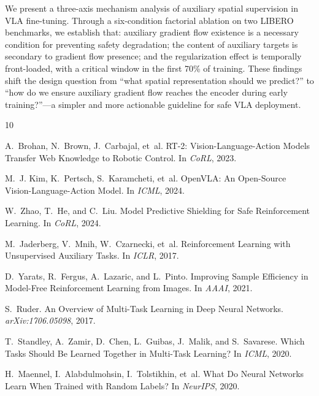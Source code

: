\documentclass[10pt,twocolumn]{article}
\begin{document}
We present a three-axis mechanism analysis of auxiliary spatial supervision in VLA fine-tuning.
Through a six-condition factorial ablation on two LIBERO benchmarks, we establish that:
auxiliary gradient flow existence is a necessary condition for preventing safety degradation;
the content of auxiliary targets is secondary to gradient flow presence;
and the regularization effect is temporally front-loaded, with a critical window in the first 70\% of training.
These findings shift the design question from ``what spatial representation should we predict?'' to ``how do we ensure auxiliary gradient flow reaches the encoder during early training?''---a simpler and more actionable guideline for safe VLA deployment.


\begin{thebibliography}{10}

A.~Brohan, N.~Brown, J.~Carbajal, et~al.
\newblock RT-2: Vision-Language-Action Models Transfer Web Knowledge to Robotic Control.
\newblock In \emph{CoRL}, 2023.

M.~J. Kim, K.~Pertsch, S.~Karamcheti, et~al.
\newblock OpenVLA: An Open-Source Vision-Language-Action Model.
\newblock In \emph{ICML}, 2024.

W.~Zhao, T.~He, and C.~Liu.
\newblock Model Predictive Shielding for Safe Reinforcement Learning.
\newblock In \emph{CoRL}, 2024.

M.~Jaderberg, V.~Mnih, W.~Czarnecki, et~al.
\newblock Reinforcement Learning with Unsupervised Auxiliary Tasks.
\newblock In \emph{ICLR}, 2017.

D.~Yarats, R.~Fergus, A.~Lazaric, and L.~Pinto.
\newblock Improving Sample Efficiency in Model-Free Reinforcement Learning from Images.
\newblock In \emph{AAAI}, 2021.

S.~Ruder.
\newblock An Overview of Multi-Task Learning in Deep Neural Networks.
\newblock \emph{arXiv:1706.05098}, 2017.

T.~Standley, A.~Zamir, D.~Chen, L.~Guibas, J.~Malik, and S.~Savarese.
\newblock Which Tasks Should Be Learned Together in Multi-Task Learning?
\newblock In \emph{ICML}, 2020.

H.~Maennel, I.~Alabdulmohsin, I.~Tolstikhin, et~al.
\newblock What Do Neural Networks Learn When Trained with Random Labels?
\newblock In \emph{NeurIPS}, 2020.

\end{thebibliography}
\end{document}
